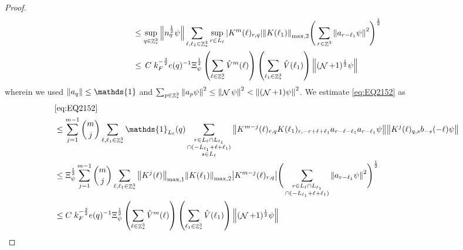 \documentclass[sn-mathphys, Numbered ,a4paper]{sn-jnl}%
\DeclareMathOperator{\Z}{\mathbb{Z}}
\DeclareMathOperator{\NN}{\mathcal{N}}
\newcommand{\half}{\frac{1}{2}}
\theoremstyle{plain}
\theoremstyle{definition}
\theoremstyle{remark}
\theoremstyle{plain}
\theoremstyle{definition}
\theoremstyle{remark}
\begin{document}
\begin{proof}
\begin{align}
	&\leq \sup\limits_{q \in \Z^3_*} \norm{ n_{q}^\half \psi} \sum\limits_{\ell, \ell_1\in \Z^3_*} \sup_{r \in L_{\ell}}\abs{K^m(\ell)_{r,q}} \norm{K(\ell_1)}_{\mathrm{max,2}} \Bigg( \sum\limits_{r\in \Z^3} \norm{  a_{r-\ell_1} \psi}^2\Bigg)^\half\nonumber\\    	
	&\leq \,C\; k_F^{-\frac{3}{2}} e(q)^{-1}\Xi_{\psi}^\half \left(\sum\limits_{\ell \in \Z^3_*} \hat{V}^{m}(\ell)\right)\left( \sum\limits_{\ell_1\in \Z^3_*} \hat{V}(\ell_1) \right) \norm{ (\NN+1)^\half \psi } \label{eq:estEQ2151}
\end{align} 
wherein we used $\norm{a_q} \leq \mathds{1}$ and $\sum_{p\in \Z^3_*}\norm{a_p \psi}^2\leq\norm{\NN\psi}^2<\norm{(\NN+1)\psi}^2$. We estimate \eqref{eq:EQ2152} as
\begin{align}
	&\eqref{eq:EQ2152}\nonumber\\
	&\leq  \sum\limits_{j=1}^{m-1} {{m}\choose j} \sum\limits_{\ell, \ell_1\in \Z^3_*}\mathds{1}_{L_{\ell}}(q) \sum\limits_{\substack{r\in L_{\ell} \cap L_{\ell_1}\\ \cap (-L_{\ell_1}+\ell+\ell_1)\\ s \in L_{\ell}}}  \norm{ K^{m-j}(\ell)_{r,q} K(\ell_1)_{r,-r+\ell+\ell_1}  a_{r-\ell-\ell_1} a_{r-\ell_1} \psi}\norm{ K^j(\ell)_{q,s}  b_{-s}(-\ell) \psi }\nonumber\\
	&\leq \Xi_{\psi}^\half \sum\limits_{j=1}^{m-1} {{m}\choose j} \sum\limits_{\ell, \ell_1\in \Z^3_*} \norm{K^{j}(\ell)}_{\mathrm{max,1}}  \norm{K(\ell_1)}_{\mathrm{max,2}} \abs{K^{m-j}(\ell)_{r,q}} \Bigg(\sum\limits_{\substack{r\in L_{\ell} \cap L_{\ell_1}\\ \cap (-L_{\ell_1}+\ell+\ell_1)}} \norm{ a_{r-\ell_1} \psi}^2\Bigg)^\half\nonumber\\
	&\leq C\; k_F^{-\frac{3}{2}} e(q)^{-1}\Xi_{\psi}^\half \left(\sum\limits_{\ell \in \Z^3_*} \hat{V}^{m}(\ell)\right)\left( \sum\limits_{\ell_1\in \Z^3_*} \hat{V}(\ell_1) \right) \norm{ (\NN+1)^\half \psi } \label{eq:estEQ2152}
\end{align}
    

\end{proof}
\end{document}
